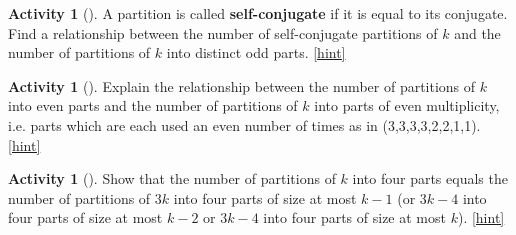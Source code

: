 \documentclass[10pt,]{book}
\newcommand{\terminology}[1]{\textbf{#1}}
\theoremstyle{plain}
\theoremstyle{definition}
\theoremstyle{definition}
\theoremstyle{definition}
\newtheorem{activity}[project]{Activity}
\numberwithin{equation}{chapter}
\begin{document}
\begin{activity}[]\label{activity-298}
\hypertarget{p-1506}{}%
A partition is called \terminology{self-conjugate} if it is equal to its conjugate. Find a relationship between the number of self-conjugate partitions of \(k\) and the number of partitions of \(k\) into distinct odd parts.%
\hfill{\tiny\hyperlink{a-305}{[hint]}\hypertarget{q-305}{}}\end{activity}
\begin{activity}[]\label{partition-even-mult-even-use}
\hypertarget{p-1510}{}%
Explain the relationship between the number of partitions of \(k\) into even parts and the number of partitions of \(k\) into parts of even multiplicity, i.e. parts which are each used an even number of times as in (3,3,3,3,2,2,1,1).%
\hfill{\tiny\hyperlink{a-306}{[hint]}\hypertarget{q-306}{}}\end{activity}
\begin{activity}[]\label{rectanglecomplement}
\hypertarget{p-1513}{}%
Show that the number of partitions of \(k\) into four parts equals the number of partitions of \(3k\) into four parts of size at most \(k-1\) (or \(3k-4\) into four parts of size at most \(k-2\) or \(3k-4\) into four parts of size at most \(k\)).%
\hfill{\tiny\hyperlink{a-307}{[hint]}\hypertarget{q-307}{}}\end{activity}
\end{document}
